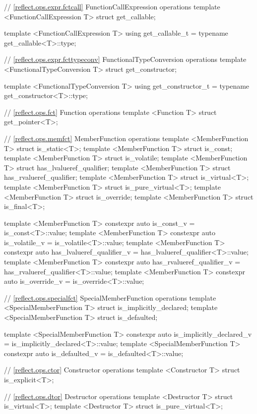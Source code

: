 \begin{std.txt}
\begin{codeblock}
{{// \ref{reflect.ops.expr.fctcall} FunctionCallExpression operations
template <FunctionCallExpression T> struct get_callable;

template <FunctionCallExpression T>
  using get_callable_t = typename get_callable<T>::type;

// \ref{reflect.ops.expr.fcttypeconv} FunctionalTypeConversion operations
template <FunctionalTypeConversion T> struct get_constructor;

template <FunctionalTypeConversion T>
  using get_constructor_t = typename get_constructor<T>::type;

// \ref{reflect.ops.fct} Function operations
template <Function T> struct get_pointer<T>;

// \ref{reflect.ops.memfct} MemberFunction operations
template <MemberFunction T> struct is_static<T>;
template <MemberFunction T> struct is_const;
template <MemberFunction T> struct is_volatile;
template <MemberFunction T> struct has_lvalueref_qualifier;
template <MemberFunction T> struct has_rvalueref_qualifier;
template <MemberFunction T> struct is_virtual<T>;
template <MemberFunction T> struct is_pure_virtual<T>;
template <MemberFunction T> struct is_override;
template <MemberFunction T> struct is_final<T>;

template <MemberFunction T>
  constexpr auto is_const_v = is_const<T>::value;
template <MemberFunction T>
  constexpr auto is_volatile_v = is_volatile<T>::value;
template <MemberFunction T>
  constexpr auto has_lvalueref_qualifier_v = has_lvalueref_qualifier<T>::value;
template <MemberFunction T>
  constexpr auto has_rvalueref_qualifier_v = has_rvalueref_qualifier<T>::value;
template <MemberFunction T>
  constexpr auto is_override_v = is_override<T>::value;

// \ref{reflect.ops.specialfct} SpecialMemberFunction operations
template <SpecialMemberFunction T> struct is_implicitly_declared;
template <SpecialMemberFunction T> struct is_defaulted;

template <SpecialMemberFunction T>
  constexpr auto is_implicitly_declared_v = is_implicitly_declared<T>::value;
template <SpecialMemberFunction T>
  constexpr auto is_defaulted_v = is_defaulted<T>::value;

// \ref{reflect.ops.ctor} Constructor operations
template <Constructor T> struct is_explicit<T>;

// \ref{reflect.ops.dtor} Destructor operations
template <Destructor T> struct is_virtual<T>;
template <Destructor T> struct is_pure_virtual<T>;

}}
\end{codeblock}
\end{std.txt}
